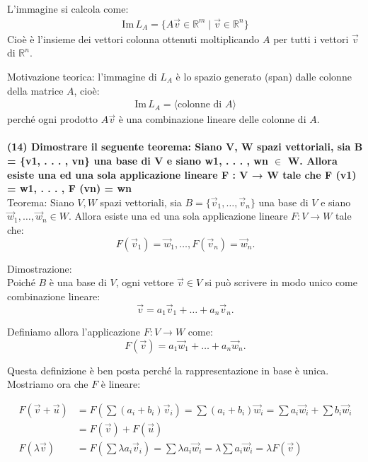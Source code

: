 \documentclass[10pt]{extarticle}
\begin{document}
L'immagine si calcola come:
\begin{align*}
    \text{Im}\, L_A = \{A\vec{v} \in \mathbb{R}^m \mid \vec{v} \in \mathbb{R}^n\}
\end{align*}
Cioè è l'insieme dei vettori colonna ottenuti moltiplicando $A$ per tutti i vettori $\vec{v}$ di $\mathbb{R}^n$.

Motivazione teorica: l'immagine di $L_A$ è lo spazio generato (span) dalle colonne della matrice $A$, cioè:
\begin{align*}
    \text{Im}\, L_A = \langle \text{colonne di } A \rangle
\end{align*}
perché ogni prodotto $A\vec{v}$ è una combinazione lineare delle colonne di $A$. \\
\vspace{1em}\\
\textbf{(14) Dimostrare il seguente teorema: Siano V, W spazi vettoriali, sia B = \{v1, . . . , vn\} una base di V e siano w1, . . . , wn $\in$ W. Allora esiste una ed una sola applicazione lineare F : V → W tale che F (v1) = w1, . . . , F (vn) = wn} \\

Teorema: Siano $V, W$ spazi vettoriali, sia $B = \{\vec{v}_1, \dots , \vec{v}_n\}$ una base di $V$ e siano $\vec{w}_1,\dots,\vec{w}_n \in W$. Allora esiste una ed una sola applicazione lineare $F : V \to W$ tale che:
\[
F(\vec{v}_1) = \vec{w}_1, \dots, F(\vec{v}_n) = \vec{w}_n.
\] 

Dimostrazione: \\

Poiché $B$ è una base di $V$, ogni vettore $\vec{v} \in V$ si può scrivere in modo unico come combinazione lineare:
\[
\vec{v} = a_1 \vec{v}_1 + \dots + a_n \vec{v}_n.
\]

Definiamo allora l'applicazione $F : V \to W$ come:
\[
F(\vec{v}) = a_1 \vec{w}_1 + \dots + a_n \vec{w}_n.
\]

Questa definizione è ben posta perché la rappresentazione in base è unica. Mostriamo ora che $F$ è lineare:

\begin{align*}
F(\vec{v} + \vec{u}) &= F\left( \sum (a_i + b_i) \vec{v}_i \right) = \sum (a_i + b_i) \vec{w}_i = \sum a_i \vec{w}_i + \sum b_i \vec{w}_i \\
&= F(\vec{v}) + F(\vec{u}) \\
F(\lambda \vec{v}) &= F\left( \sum \lambda a_i \vec{v}_i \right) = \sum \lambda a_i \vec{w}_i = \lambda \sum a_i \vec{w}_i = \lambda F(\vec{v})
\end{align*}
\end{document}
